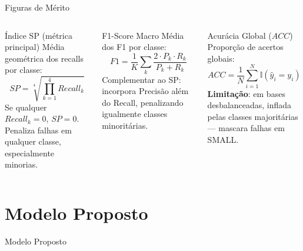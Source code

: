 \documentclass{beamer}
\begin{document}
\begin{frame}{Figuras de Mérito}
    \scriptsize
    \begin{columns}[t]
        \begin{block}{Índice SP \textnormal{(métrica principal)}}
            Média geométrica dos recalls por classe:
            \begin{equation*}
                SP = \sqrt[4]{\prod_{k=1}^{4} Recall_k}
            \end{equation*}
            Se qualquer $Recall_k = 0$, $SP = 0$. Penaliza falhas em qualquer classe, especialmente minorias.
        \end{block}

        \begin{block}{F1-Score Macro}
            Média dos F1 por classe:
            \begin{equation*}
                F1 = \frac{1}{K}\sum_{k} \frac{2 \cdot P_k \cdot R_k}{P_k + R_k}
            \end{equation*}
            Complementar ao SP: incorpora Precisão além do Recall, penalizando igualmente classes minoritárias.
        \end{block}

        \begin{block}{Acurácia Global ($ACC$)}
            Proporção de acertos globais:
            \begin{equation*}
                ACC = \frac{1}{N} \sum_{i=1}^{N} \mathbb{I}(\hat{y}_i = y_i)
            \end{equation*}
            \textbf{Limitação}: em bases desbalanceadas, inflada pelas classes majoritárias — mascara falhas em SMALL.
        \end{block}
    \end{columns}
\end{frame}

\section{Modelo Proposto}
\begin{frame}
    \centering
    \huge Modelo Proposto
    \label{sec:method}
\end{frame}
\end{document}
